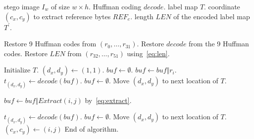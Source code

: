 \begin{algorithm}
	\caption{Extract auxiliary information.}
	\label{algo:extractT}
	
	\begin{algorithmic}[1]
		\Require stego image $I_w$ of size $w \times h$.
		\Ensure Huffman coding $decode$.
		\Ensure label map $T$.
		\Ensure coordinate $(c_x, c_y)$ to extract reference bytes $REF_e$.
		\Ensure length $LEN$ of the encoded label map $T^\prime$.
		
		
		\State Restore 9 Huffman codes from $(r_0 , \dots,  r_{31})$.
		\State Restore $decode$ from the 9 Huffman codes.
		\State Restore $LEN$ from $(r_{32} , \dots,  r_{51})$ using~\eqref{eq:len}.
		
		\State Initialize $T$.
		\State $(d_x, d_y) \gets (1, 1)$.	\label{algo:extractT:idxProce}
		\State $buf \gets \emptyset$.
		\State	$buf \gets buf \Vert r_i$.
		\State 		$t_{(d_x, d_y)} \gets decode(buf)$.		\label{algo:extractT:incdref} 
		\State 		$buf \gets \emptyset$.
		\State		Move $(d_x, d_y)$ to next location of $T$.
		\EndIf
		\EndFor
		
		 \label{algo:extractT:idxExt}
		\State 	$buf \gets buf \Vert Extract(i, j)$ by~\eqref{eq:extract}. 
		\label{algo:extractT:nextij}
		
		\State 		$t_{(d_x, d_y)} \gets decode(buf)$. \label{algo:extractT:nextd} 
		\State 		$buf \gets \emptyset$.
		\State		Move $(d_x, d_y)$ to next location of $T$.
		\State			$(c_x, c_y) \gets (i, j)$
		\State 			End of algorithm.
		\EndIf
		\EndIf
		\EndFor
	\end{algorithmic}
\end{algorithm}

